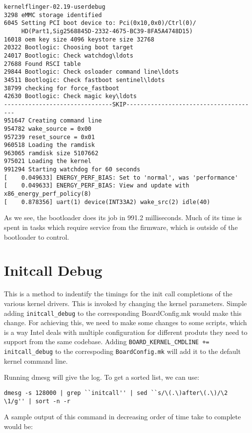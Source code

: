 \begin{Verbatim}[fontsize=\small]
kernelflinger-02.19-userdebug
3298 eMMC storage identified
6045 Setting PCI boot device to: Pci(0x10,0x0)/Ctrl(0)/
     HD(Part1,Sig2568845D-2332-4675-BC39-8FA5A4748D15)
16018 oem key size 4096 keystore size 32768
20322 Bootlogic: Choosing boot target
24017 Bootlogic: Check watchdog\ldots
27688 Found RSCI table
29844 Bootlogic: Check osloader command line\ldots
34511 Bootlogic: Check fastboot sentinel\ldots
38799 checking for force_fastboot
42630 Bootlogic: Check magic key\ldots
-------------------------------SKIP--------------------------------------
951647 Creating command line
954782 wake_source = 0x00
957239 reset_source = 0x01
960518 Loading the ramdisk
963065 ramdisk size 5107662
975021 Loading the kernel
991294 Starting watchdog for 60 seconds
[    0.049633] ENERGY_PERF_BIAS: Set to 'normal', was 'performance'
[    0.049633] ENERGY_PERF_BIAS: View and update with x86_energy_perf_policy(8)
[    0.878356] uart(1) device(INT33A2) wake_src(2) idle(40)
\end{Verbatim}

As we see, the bootloader does its job in 991.2 milliseconds.
Much of its time is spent in tasks which require service from the
firmware, which is outside of the bootloader to control.

\section {Initcall Debug}

This is a method to indentify the timings for the init call completions
of the various kernel drivers. This is invoked by changing the kernel
parameters. Simple adding \texttt{initcall\_debug} to the corresponding
BoardConfig.mk would make this change. For achieving this, we need
to make some changes to some scripts, which is a way Intel deals with
multiple configuration for different produts they need to support from
the same codebase. Adding \texttt{BOARD\_KERNEL\_CMDLINE += initcall\_debug}
to the correspoding \texttt{BoardConfig.mk} will add it to the default
kernel command line.

Running dmesg will give the log. To get a sorted list, we can use:
\begin{Verbatim}[fontsize=\small]
dmesg -s 128000 | grep ``initcall'' | sed ``s/\(.\)after\(.\)/\2 \1/g'' | sort -n -r
\end{Verbatim}

A sample output of this command in decreasing order of time take to complete would be:


